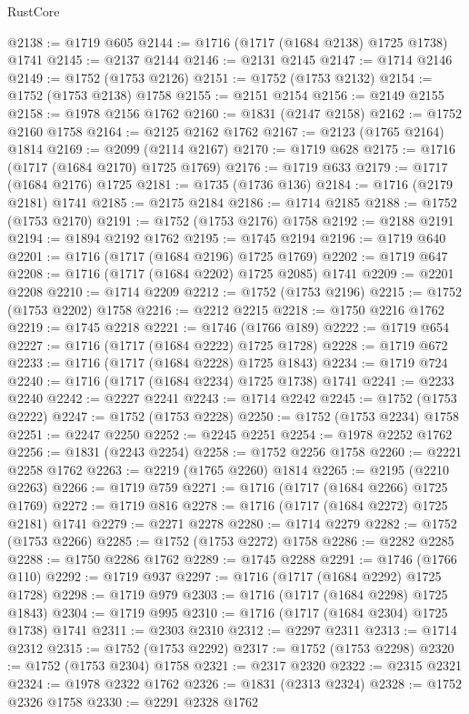 \begin{lexlean}{RustCore}
\begin{coremodule}
@2138 := @1719 @605
@2144 := @1716 (@1717 (@1684 @2138) @1725 @1738) @1741
@2145 := @2137 @2144
@2146 := @2131 @2145
@2147 := @1714 @2146
@2149 := @1752 (@1753 @2126)
@2151 := @1752 (@1753 @2132)
@2154 := @1752 (@1753 @2138) @1758
@2155 := @2151 @2154
@2156 := @2149 @2155
@2158 := @1978 @2156 @1762
@2160 := @1831 (@2147 @2158)
@2162 := @1752 @2160 @1758
@2164 := @2125 @2162 @1762
@2167 := @2123 (@1765 @2164) @1814
@2169 := @2099 (@2114 @2167)
@2170 := @1719 @628
@2175 := @1716 (@1717 (@1684 @2170) @1725 @1769)
@2176 := @1719 @633
@2179 := @1717 (@1684 @2176) @1725
@2181 := @1735 (@1736 @136)
@2184 := @1716 (@2179 @2181) @1741
@2185 := @2175 @2184
@2186 := @1714 @2185
@2188 := @1752 (@1753 @2170)
@2191 := @1752 (@1753 @2176) @1758
@2192 := @2188 @2191
@2194 := @1894 @2192 @1762
@2195 := @1745 @2194
@2196 := @1719 @640
@2201 := @1716 (@1717 (@1684 @2196) @1725 @1769)
@2202 := @1719 @647
@2208 := @1716 (@1717 (@1684 @2202) @1725 @2085) @1741
@2209 := @2201 @2208
@2210 := @1714 @2209
@2212 := @1752 (@1753 @2196)
@2215 := @1752 (@1753 @2202) @1758
@2216 := @2212 @2215
@2218 := @1750 @2216 @1762
@2219 := @1745 @2218
@2221 := @1746 (@1766 @189)
@2222 := @1719 @654
@2227 := @1716 (@1717 (@1684 @2222) @1725 @1728)
@2228 := @1719 @672
@2233 := @1716 (@1717 (@1684 @2228) @1725 @1843)
@2234 := @1719 @724
@2240 := @1716 (@1717 (@1684 @2234) @1725 @1738) @1741
@2241 := @2233 @2240
@2242 := @2227 @2241
@2243 := @1714 @2242
@2245 := @1752 (@1753 @2222)
@2247 := @1752 (@1753 @2228)
@2250 := @1752 (@1753 @2234) @1758
@2251 := @2247 @2250
@2252 := @2245 @2251
@2254 := @1978 @2252 @1762
@2256 := @1831 (@2243 @2254)
@2258 := @1752 @2256 @1758
@2260 := @2221 @2258 @1762
@2263 := @2219 (@1765 @2260) @1814
@2265 := @2195 (@2210 @2263)
@2266 := @1719 @759
@2271 := @1716 (@1717 (@1684 @2266) @1725 @1769)
@2272 := @1719 @816
@2278 := @1716 (@1717 (@1684 @2272) @1725 @2181) @1741
@2279 := @2271 @2278
@2280 := @1714 @2279
@2282 := @1752 (@1753 @2266)
@2285 := @1752 (@1753 @2272) @1758
@2286 := @2282 @2285
@2288 := @1750 @2286 @1762
@2289 := @1745 @2288
@2291 := @1746 (@1766 @110)
@2292 := @1719 @937
@2297 := @1716 (@1717 (@1684 @2292) @1725 @1728)
@2298 := @1719 @979
@2303 := @1716 (@1717 (@1684 @2298) @1725 @1843)
@2304 := @1719 @995
@2310 := @1716 (@1717 (@1684 @2304) @1725 @1738) @1741
@2311 := @2303 @2310
@2312 := @2297 @2311
@2313 := @1714 @2312
@2315 := @1752 (@1753 @2292)
@2317 := @1752 (@1753 @2298)
@2320 := @1752 (@1753 @2304) @1758
@2321 := @2317 @2320
@2322 := @2315 @2321
@2324 := @1978 @2322 @1762
@2326 := @1831 (@2313 @2324)
@2328 := @1752 @2326 @1758
@2330 := @2291 @2328 @1762

\end{coremodule}
\end{lexlean}
